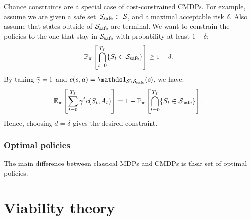 		\begin{example}
			Chance constraints are a special case of cost-constrained CMDPs. For example, assume we are given a safe set~$\S_\text{safe}\subset\S$, and a maximal acceptable risk $\delta$. Also assume that states outside of $\S_\text{safe}$ are terminal. We want to constrain the policies to the one that stay in $\S_\text{safe}$ with probability at least $1 - \delta$:
			\begin{equation*}
				\P_\pi\left[\bigcap_{t=0}^\Tf\{S_t\in\S_\text{safe}\}\right] \geq 1 - \delta.
			\end{equation*}
			By taking $\gammabar = 1$ and $c(s, a) = \indicator_{\S\setminus\S_\text{safe}}(s)$, we have:
			\begin{equation*}
			\expected_\pi\left[\sum_{t=0}^\Tf\gammabar^tc(S_t, A_t)\right] = 1 - \P_\pi\left[\bigcap_{t=0}^\Tf\{S_t\in\S_\text{safe}\}\right].
			\end{equation*}
			Hence, choosing $d = \delta$ gives the desired constraint.
		\end{example} 
		\subsubsection{Optimal policies}
		The main difference between classical MDPs and CMDPs is their set of optimal policies.
		
	\section{Viability theory} \label{sec:preliminary viability}